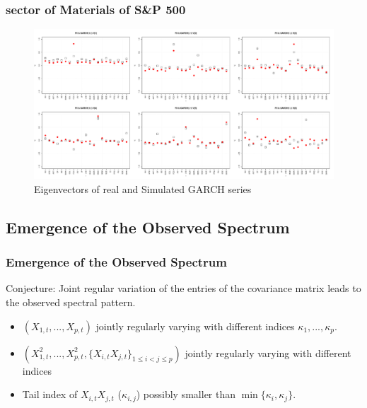 \documentclass{beamer}
\begin{document}
\begin{frame}
  \frametitle{sector of Materials of S\&P 500}
  \begin{figure}[htb!]
    \centering
    \includegraphics[width=1.0\linewidth]{Materials_eigenvectors1.pdf}
    \caption{\scriptsize Eigenvectors of real and Simulated GARCH series}
  \end{figure}
\end{frame}

\subsection{Emergence of the Observed Spectrum}
\begin{frame}
  \frametitle{Emergence of the Observed Spectrum}
  Conjecture: Joint regular variation of the entries of the covariance
  matrix leads to the observed spectral pattern.
  \begin{itemize}
  \item $(X_{1,t}, ..., X_{p,t})$ jointly regularly varying with
    different indices $\kappa_1, ..., \kappa_p$.
  \item $(X_{1,t}^2, ..., X_{p,t}^2, \{X_{i,t}X_{j,t}\}_{1 \leq i < j
      \leq p})$ jointly regularly varying with different indices
  \item Tail index of $X_{i,t} X_{j,t}$ ($\kappa_{i,j}$) possibly
    smaller than $\min\{\kappa_i, \kappa_j\}$.
  \end{itemize}
\end{frame}
\end{document}
